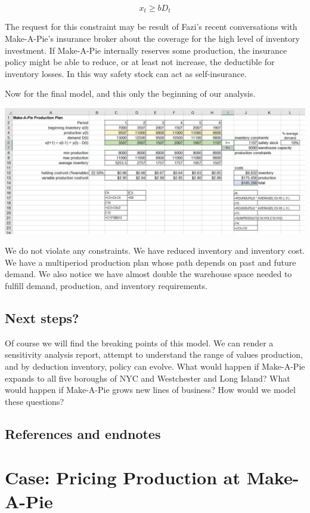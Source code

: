 \documentclass[
]{book}
\begin{document}
\[
x_t \geq bD_t
\]

The request for this constraint may be result of Fazi's recent conversations with Make-A-Pie's insurance broker about the coverage for the high level of inventory investment. If Make-A-Pie internally reserves some production, the insurance policy might be able to reduce, or at least not increase, the deductible for inventory losses. In this way safety stock can act as self-insurance.

Now for the final model, and this only the beginning of our analysis.

\includegraphics{images/04/multi-prod-model.jpg}

We do not violate any constraints. We have reduced inventory and inventory cost. We have a multiperiod production plan whose path depends on past and future demand. We also notice we have almost double the warehouse space needed to fulfill demand, production, and inventory requirements.

\hypertarget{next-steps}{%
\section{Next steps?}\label{next-steps}}

Of course we will find the breaking points of this model. We can render a sensitivity analysis report, attempt to understand the range of values production, and by deduction inventory, policy can evolve. What would happen if Make-A-Pie expands to all five boroughs of NYC and Westchester and Long Island? What would happen if Make-A-Pie grows new lines of business? How would we model these questions?

\hypertarget{references-and-endnotes}{%
\section{References and endnotes}\label{references-and-endnotes}}

\hypertarget{case-pricing-production-at-make-a-pie}{%
\chapter{Case: Pricing Production at Make-A-Pie}\label{case-pricing-production-at-make-a-pie}}
\end{document}
